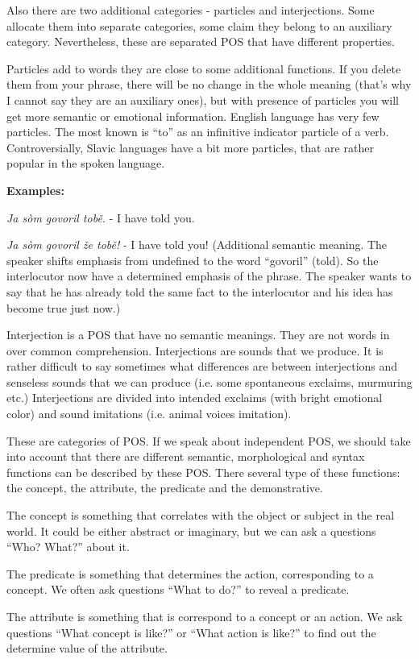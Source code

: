 Also there are two additional categories - particles and interjections. Some allocate them into separate categories, some claim they belong to an auxiliary category. Nevertheless, these are separated POS that have different properties.

Particles add to words they are close to some additional functions. If you delete them from your phrase, there will be no change in the whole meaning (that’s why I cannot say they are an auxiliary ones), but with presence of particles you will get more semantic or emotional information. English language has very few particles. The most known is “to” as an infinitive indicator particle of a verb. Controversially, Slavic languages have a bit more particles, that are rather popular in the spoken language. 

\textbf{Examples:}

\textit{Ja sòm govoril tobě. }- I have told you.

\textit{Ja sòm govoril že tobě!} - I have told you! (Additional semantic meaning. The speaker shifts emphasis from undefined to the word “govoril” (told). So the interlocutor now have a determined emphasis of the phrase. The speaker wants to say that he has already told the same fact to the interlocutor and his idea has become true just now.) 

Interjection is a POS that have no semantic meanings. They are not words in over common comprehension. Interjections are sounds that we produce. It is rather difficult to say sometimes what differences are between interjections and senseless sounds that we can produce (i.e. some spontaneous exclaims, murmuring etc.) Interjections are divided into intended exclaims (with bright emotional color) and sound imitations (i.e. animal voices imitation).

These are categories of POS. If we speak about independent POS, we should take into account that there are different semantic, morphological and syntax functions can be described by these POS. There several type of these functions: the concept, the attribute, the predicate and the demonstrative.

The concept is something that correlates with the object or subject in the real world. It could be either abstract or imaginary, but we can ask a questions “Who? What?” about it.

The predicate is something that determines the action, corresponding to a concept. We often ask questions “What to do?” to reveal a predicate.

The attribute is something that is correspond to a concept or an action. We ask questions “What concept is like?” or “What action is like?” to find out the determine value of the attribute.

